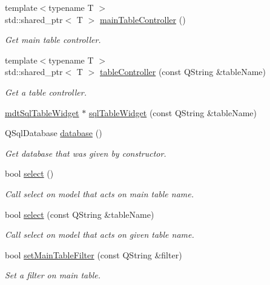 \begin{DoxyCompactItemize}
{\footnotesize template$<$typename T $>$ }\\std\-::shared\-\_\-ptr$<$ T $>$ \hyperlink{classmdt_sql_form_ac32b24ebb2d203cbefb6c7bdb8d9867b}{main\-Table\-Controller} ()
\begin{DoxyCompactList}\small\item\em Get main table controller. \end{DoxyCompactList}\item 
{\footnotesize template$<$typename T $>$ }\\std\-::shared\-\_\-ptr$<$ T $>$ \hyperlink{classmdt_sql_form_ae812518bc0c786b918dbc63bc8a69741}{table\-Controller} (const Q\-String \&table\-Name)
\begin{DoxyCompactList}\small\item\em Get a table controller. \end{DoxyCompactList}\item 
\hyperlink{classmdt_sql_table_widget}{mdt\-Sql\-Table\-Widget} $\ast$ \hyperlink{classmdt_sql_form_a6a17f32077fb7cc33139c3dc26a8d011}{sql\-Table\-Widget} (const Q\-String \&table\-Name)
\item 
Q\-Sql\-Database \hyperlink{classmdt_sql_form_ac8423f91a1f8a6fa7408cd61be86a89c}{database} ()
\begin{DoxyCompactList}\small\item\em Get database that was given by constructor. \end{DoxyCompactList}\item 
bool \hyperlink{classmdt_sql_form_a2a2f564fe934cc8997b07f90abb771e1}{select} ()
\begin{DoxyCompactList}\small\item\em Call select on model that acts on main table name. \end{DoxyCompactList}\item 
bool \hyperlink{classmdt_sql_form_ae9a1f8c03e5ac8ccd01fa804356abd01}{select} (const Q\-String \&table\-Name)
\begin{DoxyCompactList}\small\item\em Call select on model that acts on given table name. \end{DoxyCompactList}\item 
bool \hyperlink{classmdt_sql_form_a86c870d9875efbd83262f5dd28df5177}{set\-Main\-Table\-Filter} (const Q\-String \&filter)
\begin{DoxyCompactList}\small\item\em Set a filter on main table. \end{DoxyCompactList}\item 

\end{DoxyCompactItemize}
